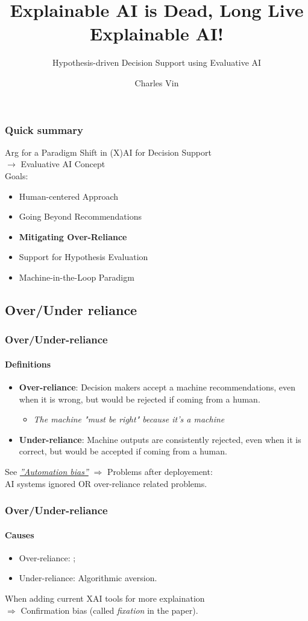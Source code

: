 \documentclass[compress,12pt]{beamer}
\title{Explainable AI is Dead, Long Live Explainable AI!}
\subtitle{Hypothesis-driven Decision Support using Evaluative AI}
\date{}
\author{\tiny Charles Vin}
\institute{\tiny Sorbonne Université - 21216136}
\begin{document}
\frame[plain]{\titlepage}

\begin{frame}
      \frametitle{Quick summary}
      Arg for a Paradigm Shift in (X)AI for Decision Support \\
      $\rightarrow$ Evaluative AI Concept \\
      Goals:
      \begin{itemize}
            \item Human-centered Approach
            \item Going Beyond Recommendations
            \item \textbf{Mitigating Over-Reliance}
            \item Support for Hypothesis Evaluation
            \item Machine-in-the-Loop Paradigm
      \end{itemize}
\end{frame}

\subsection{Over/Under reliance}
\begin{frame}
      \frametitle{Over/Under-reliance}
      \framesubtitle{Definitions}
      \begin{itemize}
            \item \textbf{Over-reliance}: Decision makers accept a machine recommendations, even when it is wrong, but would be rejected if coming from a human. \begin{itemize}
                  \item \textit{The machine "must be right" because it's a machine}
            \end{itemize}
            \item \textbf{Under-reliance}: Machine outputs are consistently rejected, even when it is correct, but would be accepted if coming from a human. 
      \end{itemize}
      See \href{https://en.wikipedia.org/wiki/Automation_bias}{\textit{''Automation bias''}}
      $ \Rightarrow  $ Problems after deployement: \\ 
      AI systems ignored OR over-reliance related problems.
\end{frame}

\begin{frame}
      \frametitle{Over/Under-reliance}
      \framesubtitle{Causes}
      \begin{itemize}
            \item Over-reliance:  ;
            \item Under-reliance: Algorithmic aversion.
      \end{itemize}
      When adding current XAI tools for more explaination \\
      $ \Rightarrow $ Confirmation bias (called \textit{fixation} in the paper).
\end{frame}
\end{document}
